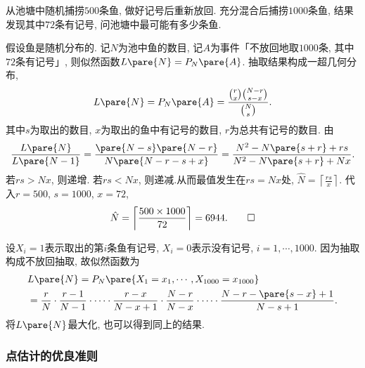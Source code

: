 \documentclass{ctexart}
\begin{document}
\begin{sample}
    \begin{ex}
        从池塘中随机捕捞$500$条鱼, 做好记号后重新放回. 充分混合后捕捞$1000$条鱼, 结果发现其中$72$条有记号, 问池塘中最可能有多少条鱼.
    \end{ex}
    \begin{solution}
        假设鱼是随机分布的. 记$N$为池中鱼的数目, 记$A$为事件「不放回地取$1000$条, 其中$72$条有记号」, 则似然函数$L\pare{N} = P_N\pare{A}$. 抽取结果构成一超几何分布,
        \[ L\pare{N} = P_N\pare{A} = \frac{\binom{r}{x} \binom{N-r}{s-x}}{\binom{N}{s}}. \]
        其中$s$为取出的数目, $x$为取出的鱼中有记号的数目, $r$为总共有记号的数目. 由
        \[ \frac{L\pare{N}}{L\pare{N-1}} = \frac{\pare{N-s}\pare{N-r}}{N\pare{N-r-s+x}} = \frac{N^2 - N\pare{s+r} + rs}{N^2 - N\pare{s+r} + Nx}. \]
        若$rs > Nx$, 则递增. 若$rs < Nx$, 则递减.从而最值发生在$rs=Nx$处, $\displaystyle \hat N = \left\lceil \frac{rs}{x} \right\rceil$. 
        代入$r=500$, $s=1000$, $x=72$,
        \[ \hat N = \left\lceil \frac{500\times 1000}{72} \right\rceil = 6944. \qedhere \]
    \end{solution}
    \begin{remark}
        设$X_i=1$表示取出的第$i$条鱼有记号, $X_i = 0$表示没有记号, $i = 1,\cdots,1000$. 因为抽取构成不放回抽取, 故似然函数为
        \begin{align*}
            & L\pare{N} = P_N\pare{X_1 = x_1,\cdots, X_{1000} = x_{1000}} \\
            &= \frac{r}{N}\cdot \frac{r-1}{N-1}\cdot \cdots \cdot \frac{r-x}{N-x+1} \cdot \frac{N-r}{N-x} \cdot \cdots \cdot \frac{N-r-\pare{s-x}+1}{N-s+1}.
        \end{align*}
        将$L\pare{N}$最大化, 也可以得到同上的结果.
    \end{remark}
\end{sample}


\subsubsection{点估计的优良准则} %
\label{ssub:点估计的优良准则}
\end{document}
